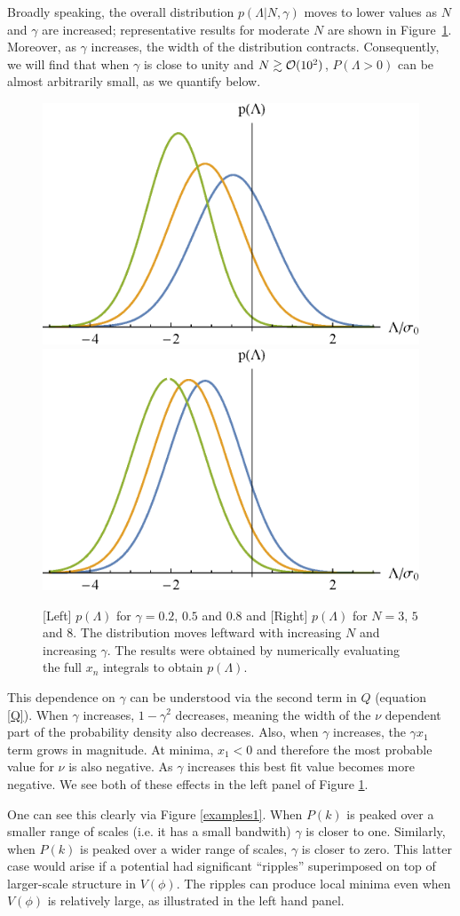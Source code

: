\documentclass[12pt]{article}
\begin{document}
Broadly speaking, the overall distribution $p(\Lambda | N,\gamma)$ moves to lower values as $N$ and $\gamma$ are increased;  representative results for moderate $N$ are shown in Figure~\ref{distributions}. Moreover, as $\gamma$ increases, the width of the distribution contracts. Consequently, we will find that when $\gamma$ is close to unity and $N \gtrsim {\cal{O}}(10^2)$, $P(\Lambda >0)$ can be almost arbitrarily small, as we quantify below. 


\begin{figure}
  \centering
  \includegraphics[width=0.45 \linewidth]{PLam_gamma.eps}  \hfill
  \includegraphics[width=0.45 \linewidth]{PLam_N.eps}
  \caption{[Left] $p(\Lambda)$ for $\gamma = 0.2$, $0.5$ and $0.8$ and [Right] $p(\Lambda)$ for $N=3$, $5$ and $8$. The distribution moves leftward with increasing $N$ and increasing $\gamma$. The results were obtained by numerically evaluating the full $x_n$ integrals to obtain $p(\Lambda)$.}
  \label{distributions}
  \end{figure}

This dependence on $\gamma$ can be understood via the second term in $Q$ (equation \eqref{Q}). When $\gamma$ increases, $1-\gamma^2$ decreases, meaning the width of the $\nu$ dependent part of the probability density also decreases. Also, when $\gamma$ increases, the $\gamma x_1$ term grows in magnitude. At minima, $x_1 <0$ and therefore the most probable value for $\nu$ is also negative. As $\gamma$ increases this best fit value becomes more negative. We see both of these effects in the left panel of Figure \ref{distributions}.

One can see this clearly via Figure \ref{examples1}. When $P(k)$ is peaked over a smaller range of scales (i.e. it has a small bandwith) $\gamma$ is closer to one. Similarly, when $P(k)$ is peaked over a wider range of scales, $\gamma$ is closer to zero. This latter case would arise if a potential had  significant ``ripples'' superimposed on top of larger-scale structure in $V(\phi)$. The ripples can produce local minima even when $V(\phi)$ is relatively large, as illustrated in the left hand panel.
 
\end{document}
